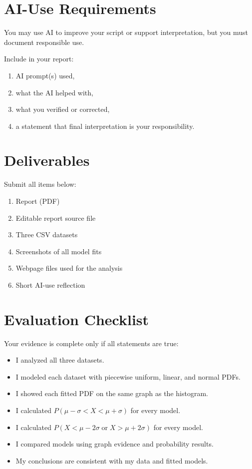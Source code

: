 	\section{AI-Use Requirements}
	You may use AI to improve your script or support interpretation, but you must document responsible use.
	
	Include in your report:
	\begin{enumerate}
		\item AI prompt(s) used,
		\item what the AI helped with,
		\item what you verified or corrected,
		\item a statement that final interpretation is your responsibility.
	\end{enumerate}

	\section{Deliverables}
	Submit all items below:
	\begin{enumerate}
		\item Report (PDF)
		\item Editable report source file
		\item Three CSV datasets
		\item Screenshots of all model fits
		\item Webpage files used for the analysis
		\item Short AI-use reflection
	\end{enumerate}

	\section{Evaluation Checklist}
	Your evidence is complete only if all statements are true:
	\begin{itemize}
		\item[\(\square\)] I analyzed all three datasets.
		\item[\(\square\)] I modeled each dataset with piecewise uniform, linear, and normal PDFs.
		\item[\(\square\)] I showed each fitted PDF on the same graph as the histogram.
		\item[\(\square\)] I calculated \(P(\mu-\sigma<X<\mu+\sigma)\) for every model.
		\item[\(\square\)] I calculated \(P(X<\mu-2\sigma\;\text{or}\;X>\mu+2\sigma)\) for every model.
		\item[\(\square\)] I compared models using graph evidence and probability results.
		\item[\(\square\)] My conclusions are consistent with my data and fitted models.
	\end{itemize}

